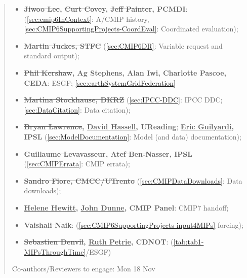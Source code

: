 \documentclass[manuscript]{copernicus}
\def\cred#1{{\color{red}#1}}
\begin{document}
\begin{abstract}
{\cred{
\begin{itemize}
    \item \textbf{\sout{Jiwoo Lee}, \sout{Curt Covey}, \sout{Jeff Painter}, PCMDI}: (\autoref{sec:cmip6InContext}: A/CMIP history, \autoref{sec:CMIP6SupportingProjects-CoordEval}: Coordinated evaluation);
    \item \textbf{\sout{Martin Juckes, STFC}} (\autoref{sec:CMIP6DR}: Variable request and standard output);
    \item \textbf{\sout{Phil Kershaw}, Ag Stephens, Alan Iwi, Charlotte Pascoe, CEDA}: ESGF; \autoref{sec:earthSystemGridFederation}
    \item \textbf{\sout{Martina Stockhause, DKRZ}} (\autoref{sec:IPCC-DDC}: IPCC DDC; \autoref{sec:DataCitation}: Data citation);
    \item \textbf{\sout{Bryan Lawrence}, \underline{David Hassell}, UReading}; \textbf{\underline{Eric Guilyardi}, IPSL} (\autoref{sec:ModelDocumentation}: Model (and data) documentation);
    \item \textbf{\sout{Guillaume Levavasseur}, \sout{Atef Ben-Nasser}, IPSL} (\autoref{sec:CMIPErrata}: CMIP errata);
    \item \textbf{\sout{Sandro Fiore, CMCC/UTrento}} (\autoref{sec:CMIPDataDownloads}: Data downloads);
    \item \textbf{\underline{Helene Hewitt}, \underline{John Dunne}, CMIP Panel}: CMIP7 handoff;
    \item \textbf{\sout{Vaishali Naik}}: (\autoref{sec:CMIP6SupportingProjects-input4MIPs} forcing);
    \item \textbf{\sout{Sebastien Denvil}, \underline{Ruth Petrie}, CDNOT}: (\autoref{tab:tab1-MIPsThroughTime}/ESGF)
\end{itemize}
}

\cred{
Co-authors/Reviewers to engage: Mon 18 Nov
}

}
\end{abstract}
\end{document}
